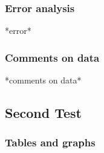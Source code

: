 \documentclass[
	letterpaper, %
	10pt, %
]{labby boi}
\begin{document}

\subsubsection{Error analysis}
*error*

\subsubsection{Comments on data}
*comments on data*

\subsection{Second Test}
\subsubsection{Tables and graphs}


\end{document}
